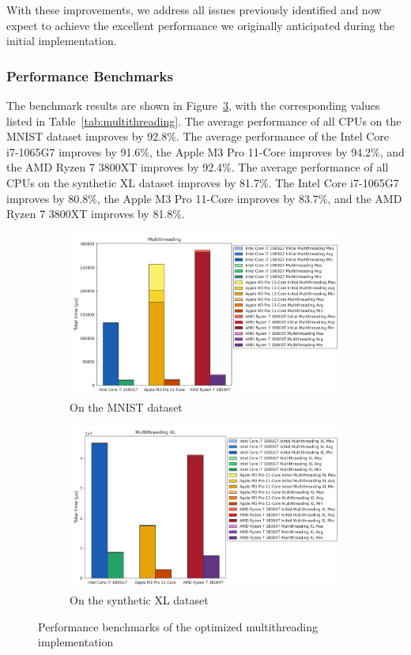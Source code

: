 \documentclass[modern,longauthor]{aastex7}
\begin{document}
With these improvements, we address all issues previously identified and now expect to achieve the excellent performance we originally anticipated during the initial implementation.
\subsubsection{Performance Benchmarks}
The benchmark results are shown in Figure~\ref{fig:multithreading}, with the corresponding values listed in Table~\ref{tab:multithreading}. The average performance of all CPUs on the MNIST dataset improves by 92.8\%. The average performance of the Intel Core i7-1065G7 improves by 91.6\%, the Apple M3 Pro 11-Core improves by 94.2\%, and the AMD Ryzen 7 3800XT improves by 92.4\%. The average performance of all CPUs on the synthetic XL dataset improves by 81.7\%. The Intel Core i7-1065G7 improves by 80.8\%, the Apple M3 Pro 11-Core improves by 83.7\%, and the AMD Ryzen 7 3800XT improves by 81.8\%.
\begin{figure}[htb!]
\centering
\begin{subfigure}{.5\textwidth}
  \centering
  \includegraphics[width=\linewidth]{Graphs/Multithreading.png}
  \caption{On the MNIST dataset}
 \label{fig:multithreading_mnist}
\end{subfigure}%
\begin{subfigure}{.5\textwidth}
  \centering
  \includegraphics[width=\linewidth]{Graphs/Multithreading XL.png}
  \caption{On the synthetic XL dataset}
 \label{fig:multithreading_xl}
\end{subfigure}
\caption{Performance benchmarks of the optimized multithreading implementation}
\label{fig:multithreading}
\end{figure}
\end{document}
